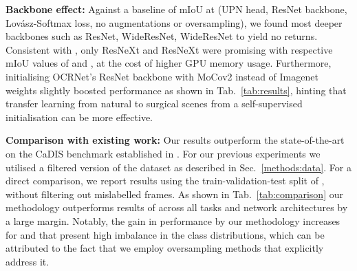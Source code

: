\documentclass[runningheads]{llncs}
\newcommand{\upr}{UPN}
\newcommand{\lov}{Lov\'{a}sz}
\newcommand{\tbf}[1]{\textbf{#1}}
\newcommand{\ta}[1]{\textbf{}}
\begin{document}
\noindent\tbf{Backbone effect:}
Against a baseline of  mIoU at \ta2 (\upr{} head, ResNet backbone, \lov{}-Softmax loss, no augmentations or oversampling), we found most deeper backbones such as ResNet, WideResNet, WideResNet to yield no returns. Consistent with \cite{resnext}, only ResNeXt and ResNeXt were promising with respective mIoU values of  and , at the cost of higher GPU memory usage. Furthermore, initialising OCRNet's ResNet backbone with MoCov2 \cite{MoCov2} instead of Imagenet weights slightly boosted performance as shown in Tab.~\ref{tab:results}, hinting that transfer learning from natural to surgical scenes from a self-supervised initialisation can be more effective.

\noindent\tbf{Comparison with existing work:}
Our results outperform the state-of-the-art on the CaDIS benchmark established in \cite{CaDIS}. For our previous experiments we utilised a filtered version of the dataset as described in Sec.~\ref{methods:data}. For a direct comparison, we report results using the train-validation-test split of \cite{CaDIS}, without filtering out mislabelled frames. As shown in Tab.~\ref{tab:comparison} our methodology outperforms results of \cite{CaDIS} across all tasks and network architectures by a large margin. Notably, the gain in performance by our methodology increases for \ta2 and \ta3 that present high imbalance in the class distributions, which can be attributed to the fact that we employ oversampling methods that explicitly address it.
\end{document}
